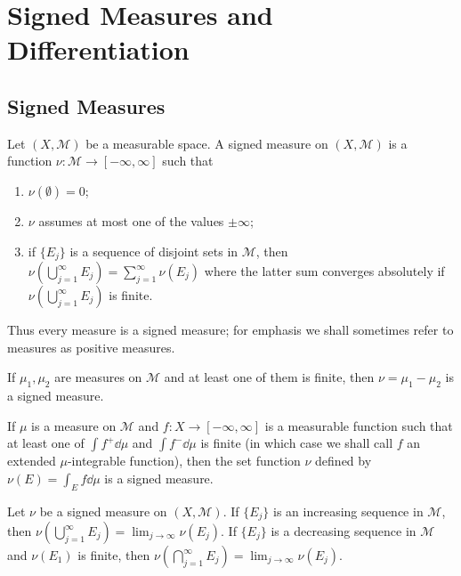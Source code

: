 \setchapterpreamble[u]{\margintoc}
\chapter{Signed Measures and Differentiation}

\section{Signed Measures}

\begin{definition}
    Let $(X, \mathcal{M})$ be a measurable space.
    A signed measure on $(X, \mathcal{M})$ is a function $\nu: \mathcal{M} \to [-\infty, \infty]$ such that
    \begin{enumerate}
        \item $\nu(\emptyset) = 0$;
        \item $\nu$ assumes at most one of the values $\pm \infty$;
        \item if $\{ E_j \}$ is a sequence of disjoint sets in $\mathcal{M}$, then $\nu(\bigcup_{j=1}^{\infty} E_j) = \sum_{j=1}^{\infty} \nu(E_j)$ where the latter sum converges absolutely if $\nu(\bigcup_{j=1}^{\infty} E_j)$ is finite.
    \end{enumerate}
\end{definition}

Thus every measure is a signed measure; for emphasis we shall sometimes refer to measures as positive measures.

\begin{example}
    If $\mu_1, \mu_2$ are measures on $\mathcal{M}$ and at least one of them is finite, then $\nu = \mu_1 - \mu_2$ is a signed measure.
\end{example}

\begin{example}
    If $\mu$ is a measure on $\mathcal{M}$ and $f: X \to [-\infty, \infty]$ is a measurable function such that at least one of $\int f^+ \dd \mu$ and $\int f^- \dd \mu$ is finite (in which case we shall call $f$ an extended $\mu$-integrable function), then the set function $\nu$ defined by $\nu(E) = \int_{E} f \dd \mu$ is a signed measure.
\end{example}

\begin{proposition}
    Let $\nu$ be a signed measure on $(X, \mathcal{M})$.
    If $\{ E_j \}$ is an increasing sequence in $\mathcal{M}$, then $\nu(\bigcup_{j=1}^{\infty} E_j) = \lim_{j \to \infty} \nu(E_j)$.
    If $\{ E_j \}$ is a decreasing sequence in $\mathcal{M}$ and $\nu(E_1)$ is finite, then $\nu(\bigcap_{j=1}^{\infty} E_j) = \lim_{j \to \infty} \nu(E_j)$.
\end{proposition}

